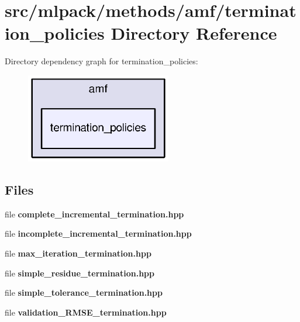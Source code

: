 \section{src/mlpack/methods/amf/termination\+\_\+policies Directory Reference}
\label{dir_c5874ad48fbf1d21a244b283cb97025e}
Directory dependency graph for termination\+\_\+policies\+:
\nopagebreak
\begin{figure}[H]
\begin{center}
\leavevmode
\includegraphics[width=180pt]{dir_c5874ad48fbf1d21a244b283cb97025e_dep}
\end{center}
\end{figure}
\subsection*{Files}
\begin{DoxyCompactItemize}
\item 
file {\bf complete\+\_\+incremental\+\_\+termination.\+hpp}
\item 
file {\bf incomplete\+\_\+incremental\+\_\+termination.\+hpp}
\item 
file {\bf max\+\_\+iteration\+\_\+termination.\+hpp}
\item 
file {\bf simple\+\_\+residue\+\_\+termination.\+hpp}
\item 
file {\bf simple\+\_\+tolerance\+\_\+termination.\+hpp}
\item 
file {\bf validation\+\_\+\+R\+M\+S\+E\+\_\+termination.\+hpp}
\end{DoxyCompactItemize}
